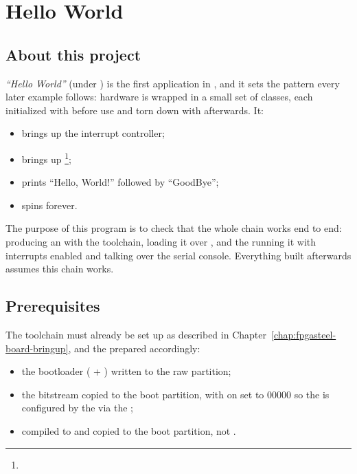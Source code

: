 \chapter{Hello World}
\label{chap:fpgasteel-hello-world}

\section{About this project}
\label{sec:fpgasteel-hello-about}

\textit{``Hello World''} (under ) is the first application in , and it sets the pattern every later example follows: hardware is wrapped in a small set of classes, each initialized with  before use and torn down with  afterwards. It:

\begin{itemize}
    \item brings up the interrupt controller;
    \item brings up \footnote{};
    \item prints ``Hello, World!'' followed by ``GoodBye'';
    \item spins forever.
\end{itemize}

The purpose of this program is to check that the whole chain works end to end:  producing an  with the  toolchain,  loading it over , and the  running it with interrupts enabled and talking over the serial console. Everything built afterwards assumes this chain works.

\section{Prerequisites}
\label{sec:fpgasteel-hello-prerequisites}

The toolchain must already be set up as described in Chapter~\ref{chap:fpgasteel-board-bringup}, and the  prepared accordingly:

\begin{itemize}
    \item the bootloader ( + ) written to the raw  partition;
    \item the  bitstream  copied to the boot partition, with  on  set to 00000 so the  is configured by the  via the ;
    \item {} compiled to  and copied to the boot partition, not .
\end{itemize}

